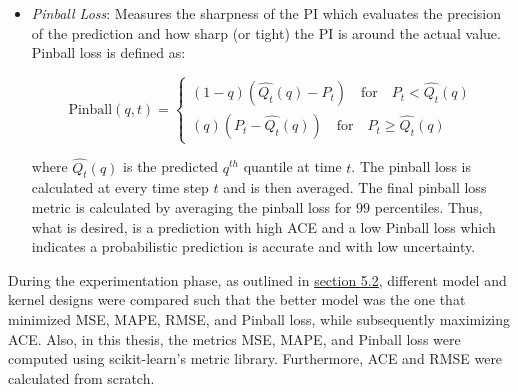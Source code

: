 \begin{itemize}
    \item \textit{Pinball Loss}: Measures the sharpness of the PI which evaluates the precision of the prediction and how sharp (or tight) the PI is around the actual value. Pinball loss is defined as:
    
    $$ \text{Pinball}(q, t) = 
    \begin{cases}
    (1 - q)(\hat{Q_t}(q) - P_t) \quad \text{for} \quad P_t < \hat{Q_t}(q) \\
    (q)(P_t - \hat{Q_t}(q)) \quad \text{for} \quad P_t \ge \hat{Q_t}(q) 
    \end{cases}
    $$
    
    where $\hat{Q_t}(q)$ is the predicted $q^{th}$ quantile at time $t$. The pinball loss is calculated at every time step $t$ and is then averaged. The final pinball loss metric is calculated by averaging the pinball loss for $99$ percentiles. Thus, what is desired, is a prediction with high ACE and a low Pinball loss which indicates a probabilistic prediction is accurate and with low uncertainty.
    
\end{itemize}

During the experimentation phase, as outlined in \hyperlink{subsection.5.2}{section 5.2}, different model and kernel designs were compared such that the better model was the one that minimized MSE, MAPE, RMSE, and Pinball loss, while subsequently maximizing ACE. Also, in this thesis, the metrics MSE, MAPE, and Pinball loss were computed using scikit-learn's \cite{scikit-learn} metric library. Furthermore, ACE and RMSE were calculated from scratch. 



